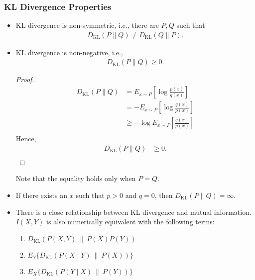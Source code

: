 \documentclass[a4paper,12pt]{article}
\theoremstyle{definition}
\begin{document}
\subsubsection*{KL Divergence Properties}
\begin{itemize}
    \item KL divergence is non-symmetric, i.e., there are $P, Q$ such that
    \begin{align*}
        D_{\mathrm{KL}}(P\|Q) \neq D_{\mathrm{KL}}(Q\|P).
    \end{align*}
    \item KL divergence is non-negative, i.e.,
    \begin{align*}
        D_{\mathrm{KL}}(P\|Q) \geq 0.
    \end{align*}
    \begin{proof}
        \begin{align*}
            D_{\mathrm{KL}}(P\|Q) &= E_{x \sim P} \left[ \log \frac{p(x)}{q(x)} \right] \\
                                  &= -E_{x \sim P} \left[ \log \frac{q(x)}{p(x)} \right] \\
                                  &\geq -\log E_{x \sim P} \left[ \frac{q(x)}{p(x)} \right] \\
        \end{align*}
        Hence,
        \begin{align*}
            D_{\mathrm{KL}}(P\|Q) &\geq 0. \\
        \end{align*}
    \end{proof}
    Note that the equality holds only when $P = Q$.
    \item If there exists an $x$ such that $p > 0$ and $q = 0$, 
    then $D_{\mathrm{KL}}(P\|Q) = \infty$.
    \item There is a close relationship between KL divergence and mutual information. 
    $I(X,Y)$ is also numerically equivalent with the following terms:
    \begin{enumerate}
        \item $D_{\mathrm{KL}}(P(X, Y) \ \| \ P(X)P(Y))$
        \item $E_Y \{ D_{\mathrm{KL}}(P(X \mid Y) \ \| \ P(X)) \}$
        \item $E_X \{ D_{\mathrm{KL}}(P(Y \mid X) \ \| \ P(Y)) \}$
    \end{enumerate}
\end{itemize}
\end{document}
